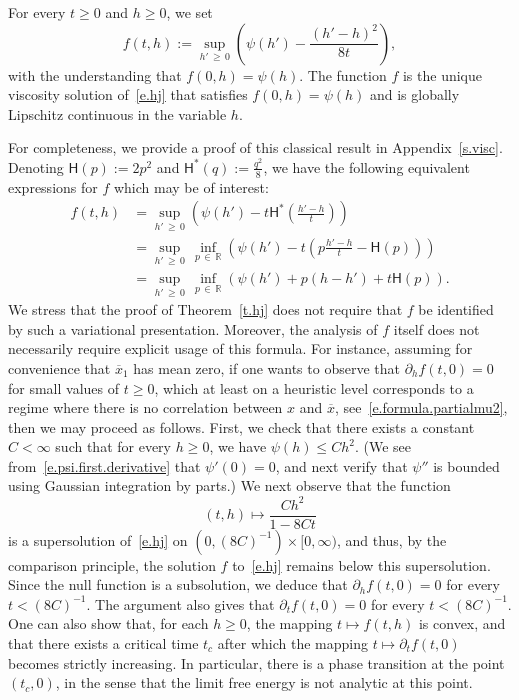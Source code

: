 \documentclass[10pt]{amsart}
\theoremstyle{definition}\newtheorem{defi}[theo]{Definition}\newtheorem{rema}[theo]{Remark}\newtheorem{exam}[theo]{Example}\newtheorem{exem}[theo]{Example}\newtheorem{nota}[theo]{Notation}
\newcommand{\R}{\mathbb{R}}
\newcommand{\sfH}{\mathsf{H}}
\newcommand{\1}{\mathds{1}}
\renewcommand{\le}{\leqslant}
\renewcommand{\ge}{\geqslant}
\renewcommand{\bar}{\overline}
\begin{document}
\begin{prop}\label{p.hopf-lax}
For every $t \ge 0$ and $h \ge 0$, we set
\begin{equation}\label{e.hopf-lax}
f(t,h) := \sup_{h'\,\ge\,0} \left(\psi({h}') - \frac{({h}' - {h})^2}{8t} \right),
\end{equation}
with the understanding that $f(0,h) = \psi(h)$. The function $f$ is the unique viscosity solution of~\eqref{e.hj} that satisfies $f(0,h) = \psi(h)$ and is globally Lipschitz continuous in the variable $h$.
\end{prop}

For completeness, we provide a proof of this classical result in Appendix~\ref{s.visc}. Denoting $\sfH(p) := 2p^2$ and $\sfH^*(q) := \frac{q^2}{8}$, we have the following equivalent expressions for $f$ which may be of interest:
\begin{align*}
f(t,h) & = \sup_{h'\,\ge\,0} \left(\psi({h}') - t \sfH^* \left(\frac{{h}' - {h}}{t} \right) \right) \\
& = \sup_{h'\,\ge\,0} \, \inf_{p\,\in\,\R} \left(\psi(h') - t \left(p \frac{h'-h}{t} - \sfH(p) \right) \right) \\
& = \sup_{h'\,\ge\,0} \, \inf_{p\,\in\,\R} \left(\psi(h') + p (h-h') + t \sfH(p) \right).
\end{align*}
We stress that the proof of Theorem~\ref{t.hj} does not require that $f$ be identified by such a variational presentation. Moreover, the analysis of $f$ itself does not necessarily require explicit usage of this formula. For instance, assuming for convenience that $\bar x_1$ has mean zero, if one wants to observe that $\partial_h f(t,0) = 0$ for small values of $t \ge 0$, which at least on a heuristic level corresponds to a regime where there is no correlation between $x$ and $\bar x$, see~\eqref{e.formula.partialmu2}, then we may proceed as follows. First, we check that there exists a constant $C < \infty$ such that for every $h \ge 0$, we have $\psi(h) \le C h^2$. (We see from~\eqref{e.psi.first.derivative} that $\psi'(0) = 0$, and next verify that $\psi''$ is bounded using Gaussian integration by parts.) We next observe that the function
\[
(t,h) \mapsto \frac{C h^2}{1-8Ct}
\]
is a supersolution of~\eqref{e.hj} on $(0,(8C)^{-1})\times [0,\infty)$, and thus, by the comparison principle, the solution $f$ to~\eqref{e.hj} remains below this supersolution. Since the null function is a subsolution, we deduce that $\partial_h f(t,0) = 0$ for every $t <(8C)^{-1}$. The argument also gives that $\partial_t f(t,0) = 0$ for every $t < (8C)^{-1}$. One can also show that, for each $h \ge 0$, the mapping $t \mapsto f(t,h)$ is convex, and that there exists a critical time $t_c$ after which the mapping $t \mapsto \partial_t f(t,0)$ becomes strictly increasing. In particular, there is a phase transition at the point $(t_c,0)$, in the sense that the limit free energy is not analytic at this point.
\end{document}
